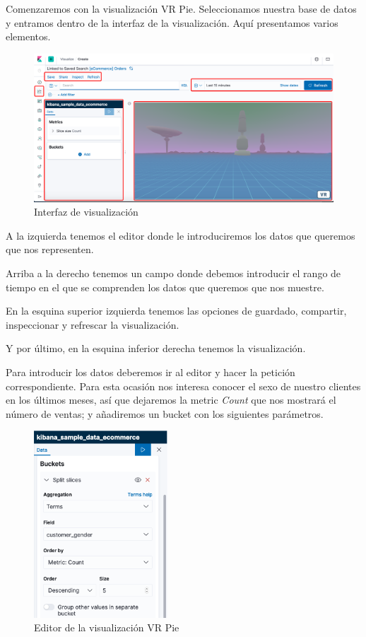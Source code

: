 \documentclass[a4paper, 12pt]{book}
\begin{document}
Comenzaremos con la visualización VR Pie. Seleccionamos nuestra base de datos y entramos dentro de la interfaz de la visualización. Aquí presentamos varios elementos.

\begin{figure}[H]
  \centering
  \includegraphics[width=14cm, keepaspectratio]{img/development/interfaz-visualizacion.png}
  \caption{Interfaz de visualización}
  \label{fig:interfazvisualizacion}
\end{figure}

A la izquierda tenemos el editor donde le introduciremos los datos que queremos que nos representen.

Arriba a la derecho tenemos un campo donde debemos introducir el rango de tiempo en el que se comprenden los datos que queremos que nos muestre.

En la esquina superior izquierda tenemos las opciones de guardado, compartir, inspeccionar y refrescar la visualización.

Y por último, en la esquina inferior derecha tenemos la visualización.

Para introducir los datos deberemos ir al editor y hacer la petición correspondiente. Para esta ocasión nos interesa conocer el sexo de nuestro clientes en los últimos meses, así que dejaremos la metric \textit{Count} que nos mostrará el número de ventas; y añadiremos un bucket con los siguientes parámetros.

\begin{figure}[H]
  \centering
  \includegraphics[width=5cm, keepaspectratio]{img/development/editor-pie.png}
  \caption{Editor de la visualización VR Pie}
  \label{fig:editorpie}
\end{figure}
\end{document}
